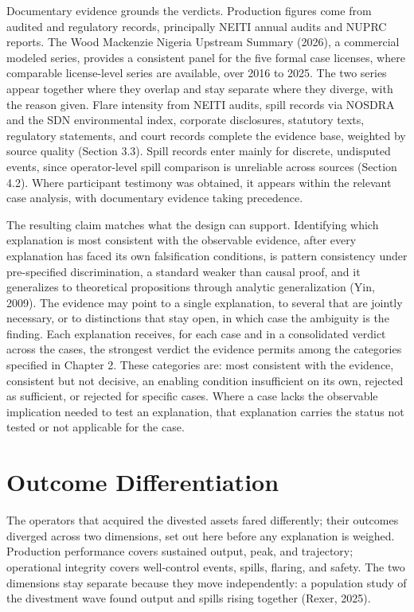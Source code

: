 \documentclass[twoside,fontset=lmodern]{mitthesis}
\begin{document}
Documentary evidence grounds the verdicts. Production figures come from
audited and regulatory records, principally NEITI annual audits and
NUPRC reports. The Wood Mackenzie Nigeria Upstream Summary (2026), a
commercial modeled series, provides a consistent panel for the five
formal case licenses, where comparable license-level series are
available, over 2016 to 2025. The two series appear together where they
overlap and stay separate where they diverge, with the reason given.
Flare intensity from NEITI audits, spill records via NOSDRA and the SDN
environmental index, corporate disclosures, statutory texts, regulatory
statements, and court records complete the evidence base, weighted by
source quality (Section 3.3). Spill records enter mainly for discrete,
undisputed events, since operator-level spill comparison is unreliable
across sources (Section 4.2). Where participant testimony was obtained,
it appears within the relevant case analysis, with documentary evidence
taking precedence.

The resulting claim matches what the design can support. Identifying
which explanation is most consistent with the observable evidence, after
every explanation has faced its own falsification conditions, is pattern
consistency under pre-specified discrimination, a standard weaker than
causal proof, and it generalizes to theoretical propositions through
analytic generalization (Yin, 2009). The evidence may point to a single
explanation, to several that are jointly necessary, or to distinctions
that stay open, in which case the ambiguity is the finding. Each
explanation receives, for each case and in a consolidated verdict across
the cases, the strongest verdict the evidence permits among the
categories specified in Chapter 2. These categories are: most consistent
with the evidence, consistent but not decisive, an enabling condition
insufficient on its own, rejected as sufficient, or rejected for
specific cases. Where a case lacks the observable implication needed to
test an explanation, that explanation carries the status not tested or
not applicable for the case.

\hypertarget{outcome-differentiation}{%
\section{Outcome Differentiation}\label{outcome-differentiation}}

The operators that acquired the divested assets fared differently; their
outcomes diverged across two dimensions, set out here before any
explanation is weighed. Production performance covers sustained output,
peak, and trajectory; operational integrity covers well-control events,
spills, flaring, and safety. The two dimensions stay separate because
they move independently: a population study of the divestment wave found
output and spills rising together (Rexer, 2025).
\end{document}
